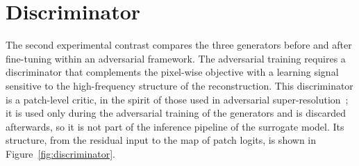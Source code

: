\section{Discriminator}
\label{sec:method_discriminator}

The second experimental contrast compares the three generators before and after fine-tuning within an adversarial framework. The adversarial training requires a discriminator that complements the pixel-wise objective with a learning signal sensitive to the high-frequency structure of the reconstruction. This discriminator is a patch-level critic, in the spirit of those used in adversarial super-resolution~\cite{cvf_srgan}; it is used only during the adversarial training of the generators and is discarded afterwards, so it is not part of the inference pipeline of the surrogate model. Its structure, from the residual input to the map of patch logits, is shown in Figure~\ref{fig:discriminator}.

